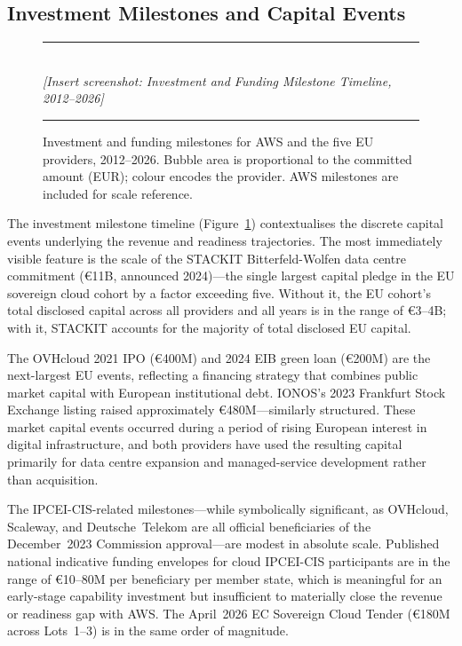 \subsection{Investment Milestones and Capital Events}
\label{subsec:investment_milestones}

\begin{figure}[htbp]
  \centering
  \vspace{0.4cm}
  \noindent\rule{\linewidth}{0.4pt}\\[0.3cm]
  {\small\itshape [Insert screenshot: Investment and Funding Milestone Timeline, 2012--2026]}\\[0.3cm]
  \noindent\rule{\linewidth}{0.4pt}
  \vspace{0.2cm}
  \caption{Investment and funding milestones for AWS and the five EU providers, 2012--2026. Bubble area is proportional to the committed amount (EUR); colour encodes the provider. AWS milestones are included for scale reference.}
  \label{fig:milestone_timeline}
\end{figure}

The investment milestone timeline (Figure~\ref{fig:milestone_timeline}) contextualises the discrete capital events underlying the revenue and readiness trajectories. The most immediately visible feature is the scale of the STACKIT Bitterfeld-Wolfen data centre commitment (€11B, announced 2024)---the single largest capital pledge in the EU sovereign cloud cohort by a factor exceeding five. Without it, the EU cohort's total disclosed capital across all providers and all years is in the range of €3--4B; with it, STACKIT accounts for the majority of total disclosed EU capital.

The OVHcloud 2021 IPO (€400M) and 2024 EIB green loan (€200M) are the next-largest EU events, reflecting a financing strategy that combines public market capital with European institutional debt. IONOS's 2023 Frankfurt Stock Exchange listing raised approximately €480M---similarly structured. These market capital events occurred during a period of rising European interest in digital infrastructure, and both providers have used the resulting capital primarily for data centre expansion and managed-service development rather than acquisition.

The IPCEI-CIS-related milestones---while symbolically significant, as OVHcloud, Scaleway, and Deutsche~Telekom are all official beneficiaries of the December~2023 Commission approval---are modest in absolute scale. Published national indicative funding envelopes for cloud IPCEI-CIS participants are in the range of €10--80M per beneficiary per member state, which is meaningful for an early-stage capability investment but insufficient to materially close the revenue or readiness gap with AWS. The April~2026 EC Sovereign Cloud Tender (€180M across Lots~1--3) is in the same order of magnitude.

